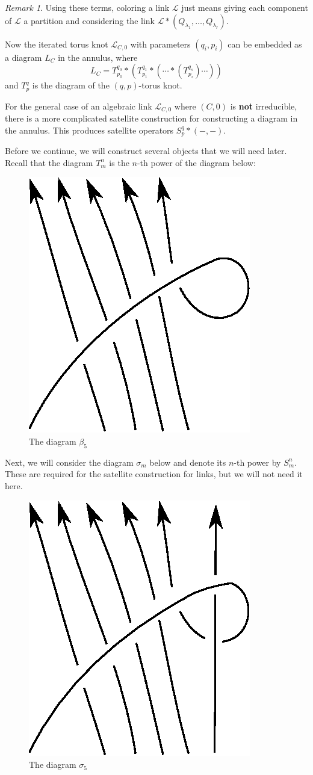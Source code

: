 \documentclass{amsart}
\theoremstyle{definition}
\theoremstyle{remark}
\newtheorem{rmk}[thm]{Remark}
\theoremstyle{plain}
\theoremstyle{definition}
\theoremstyle{remark}
\newcommand{\mc}[1]{\mathcal{#1}}
\newcommand{\1}{\mathbf{1}}
\newcommand{\2}{\mathbf{2}}
\newcommand{\3}{\mathbf{3}}
\begin{document}
\begin{rmk}
    Using these terms, coloring a link $\mc{L}$ just means giving each component of $\mc{L}$ a partition and considering the link $\mc{L} * (Q_{\lambda_1}, \ldots, Q_{\lambda_r})$.
\end{rmk}

Now the iterated torus knot $\mc{L}_{C,0}$ with parameters $(q_i, p_i)$ can be embedded as a diagram $L_C$ in the annulus, where
\[ L_C = T_{p_0}^{q_0} * (T_{p_1}^{q_1} * (\cdots * (T_{p_s}^{q_s}) \cdots)) \]
and $T_p^q$ is the diagram of the $(q,p)$-torus knot.

For the general case of an algebraic link $\mc{L}_{C,0}$ where $(C,0)$ is \textbf{not} irreducible, there is a more complicated satellite construction for constructing a diagram in the annulus. This produces satellite operators $S_p^q * (-,-)$.

Before we continue, we will construct several objects that we will need later. Recall that the diagram $T_m^n$ is the $n$-th power of the diagram below: 
\begin{figure}[H]
    \centering
    \includegraphics[width=0.2\linewidth]{torusbraid.eps}
    \caption{The diagram $\beta_5$}%
    \label{fig:torusbraid}
\end{figure}
Next, we will consider the diagram $\sigma_m$ below and denote its $n$-th power by $S_m^n$. These are required for the satellite construction for links, but we will not need it here.
\begin{figure}[H]
    \centering
    \includegraphics[width=0.2\linewidth]{splicebraid.eps}
    \caption{The diagram $\sigma_5$}%
    \label{fig:splicebraid}
\end{figure}
\end{document}
